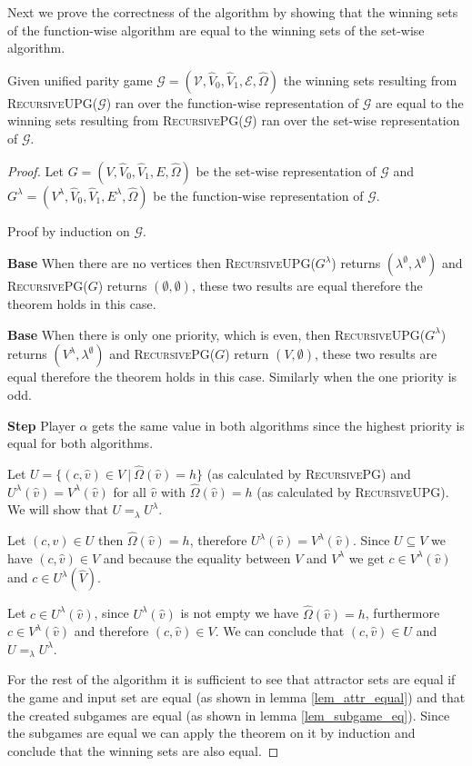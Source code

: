 Next we prove the correctness of the algorithm by showing that the winning sets of the function-wise algorithm are equal to the winning sets of the set-wise algorithm.
\begin{theorem}
	Given unified parity game $\mathcal{G} = (\mathcal{V},\hat{V}_0,\hat{V}_1, \mathcal{E}, \hat{\Omega})$ the winning sets resulting from \textsc{RecursiveUPG($\mathcal{G}$)} ran over the function-wise representation of $\mathcal{G}$ are equal to the winning sets resulting from \textsc{RecursivePG($\mathcal{G}$)} ran over the set-wise representation of $\mathcal{G}$.
	\begin{proof}
		Let $G = (V,\hat{V}_0,\hat{V}_1,E,\hat{\Omega})$ be the set-wise representation of $\mathcal{G}$ and $G^\lambda = (V^\lambda, \hat{V}_0, \hat{V}_1, E^\lambda, \hat{\Omega})$ be the function-wise representation of $\mathcal{G}$.
		
		Proof by induction on $\mathcal{G}$.
		
		\textbf{Base} When there are no vertices then \textsc{RecursiveUPG($G^\lambda$)} returns $(\lambda^\emptyset,\lambda^\emptyset)$ and \textsc{RecursivePG($G$)} returns $(\emptyset,\emptyset)$, these two results are equal therefore the theorem holds in this case.
		
		\textbf{Base} When there is only one priority, which is even, then \textsc{RecursiveUPG($G^\lambda$)} returns $(V^\lambda,\lambda^\emptyset)$ and \textsc{RecursivePG($G$)} return $(V,\emptyset)$, these two results are equal therefore the theorem holds in this case. Similarly when the one priority is odd.
		
		\textbf{Step}
		Player $\alpha$ gets the same value in both algorithms since the highest priority is equal for both algorithms.
		
		Let $U = \{(c,\hat{v}) \in V\ |\ \hat{\Omega}(\hat{v}) = h \}$ (as calculated by \textsc{RecursivePG}) and $U^\lambda(\hat{v}) = V^\lambda(\hat{v})$ for all $\hat{v}$ with $\hat{\Omega}(\hat{v}) = h$ (as calculated by \textsc{RecursiveUPG}). We will show that $U =_\lambda U^\lambda$.
		
		Let $(c,\hat{v}) \in U$ then $\hat{\Omega}(\hat{v}) = h$, therefore $U^\lambda(\hat{v}) = V^\lambda(\hat{v})$. Since $U \subseteq V$ we have $(c,\hat{v}) \in V$ and because the equality between $V$ and $V^\lambda$ we get $c \in V^\lambda(\hat{v})$ and $c \in U^\lambda(\hat{V})$.
		
		Let $c \in U^\lambda(\hat{v})$, since $U^\lambda(\hat{v})$ is not empty we have $\hat{\Omega}(\hat{v}) = h$, furthermore $c \in V^\lambda(\hat{v})$ and therefore $(c,\hat{v}) \in V$. We can conclude that $(c, \hat{v}) \in U$ and $U =_\lambda U^\lambda$.
		
		For the rest of the algorithm it is sufficient to see that attractor sets are equal if the game and input set are equal (as shown in lemma \ref{lem_attr_equal}) and that the created subgames are equal (as shown in lemma \ref{lem_subgame_eq}). Since the subgames are equal we can apply the theorem on it by induction and conclude that the winning sets are also equal.
	\end{proof}
\end{theorem}

